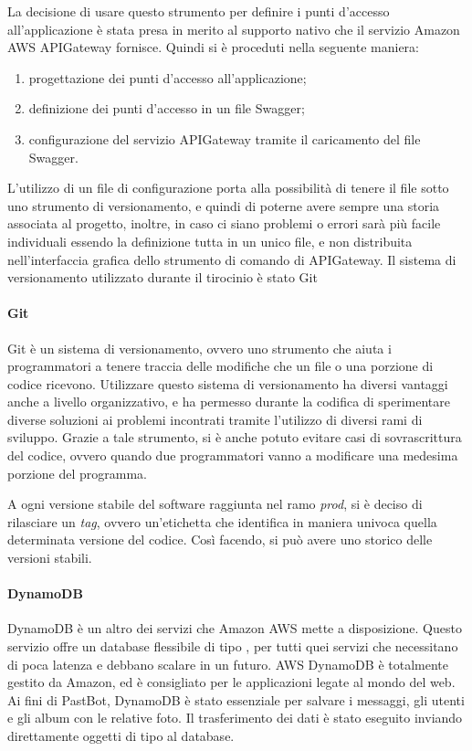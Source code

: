 La decisione di usare questo strumento per definire i punti d'accesso
all'applicazione è stata presa in merito al supporto nativo che il servizio
Amazon AWS APIGateway fornisce. Quindi si è proceduti nella seguente maniera:
\begin{enumerate}
  \item progettazione dei punti d'accesso all'applicazione;
  \item definizione dei punti d'accesso in un file Swagger;
  \item configurazione del servizio APIGateway tramite il caricamento del file
Swagger.
\end{enumerate}


L'utilizzo di un file di configurazione porta alla possibilità di
tenere il file sotto uno strumento di versionamento, e quindi di poterne avere
sempre una storia associata al progetto, inoltre, in caso ci siano problemi o
errori sarà più facile individuali essendo la definizione tutta in un unico
file, e non distribuita nell'interfaccia grafica dello strumento di comando di
APIGateway.
Il sistema di versionamento utilizzato durante il tirocinio è stato Git


\paragraph*{Git}
\label{tecnologie:git}
Git è un sistema di versionamento, ovvero uno strumento che aiuta i
programmatori a tenere traccia delle modifiche che un file o una porzione di
codice ricevono. Utilizzare questo sistema di versionamento ha diversi vantaggi
anche a livello organizzativo, e ha permesso durante la codifica di
sperimentare diverse soluzioni ai problemi incontrati tramite l'utilizzo di
diversi rami di sviluppo. Grazie a tale strumento, si è anche potuto evitare
casi di sovrascrittura del codice, ovvero quando due programmatori vanno a
modificare una medesima porzione del programma.

A ogni versione stabile del software raggiunta nel ramo \textit{prod}, si è
deciso di rilasciare un \textit{tag}, ovvero un'etichetta che identifica in
maniera univoca quella determinata versione del codice. Così facendo, si può
avere uno storico delle versioni stabili.

\paragraph*{DynamoDB}
DynamoDB è un altro dei servizi che Amazon AWS mette a disposizione. Questo
servizio offre un database flessibile di tipo , per tutti
quei servizi che necessitano di poca latenza e debbano scalare in un futuro.
AWS DynamoDB è totalmente gestito da Amazon, ed è consigliato per le
applicazioni legate al mondo del web.
Ai fini di PastBot, DynamoDB è stato essenziale per salvare i messaggi, gli
utenti e gli album con le relative foto. Il trasferimento dei dati è stato
eseguito inviando direttamente oggetti di tipo
 al database.

